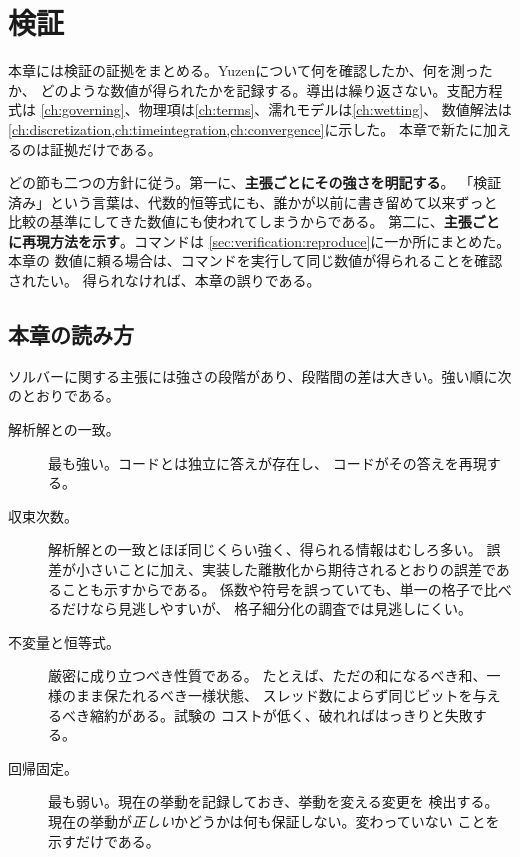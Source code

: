 \chapter{検証}
\label{ch:verification}

本章には検証の証拠をまとめる。Yuzenについて何を確認したか、何を測ったか、
どのような数値が得られたかを記録する。導出は繰り返さない。支配方程式は
\cref{ch:governing}、物理項は\cref{ch:terms}、濡れモデルは\cref{ch:wetting}、
数値解法は\cref{ch:discretization,ch:timeintegration,ch:convergence}に示した。
本章で新たに加えるのは証拠だけである。

どの節も二つの方針に従う。第一に、\textbf{主張ごとにその強さを明記する}。
「検証済み」という言葉は、代数的恒等式にも、誰かが以前に書き留めて以来ずっと
比較の基準にしてきた数値にも使われてしまうからである。
第二に、\textbf{主張ごとに再現方法を示す}。コマンドは
\cref{sec:verification:reproduce}に一か所にまとめた。本章の
数値に頼る場合は、コマンドを実行して同じ数値が得られることを確認されたい。
得られなければ、本章の誤りである。

\section{本章の読み方}
\label{sec:verification:policy}

ソルバーに関する主張には強さの段階があり、段階間の差は大きい。強い順に次のとおりである。

\begin{description}
  \item[解析解との一致。] 最も強い。コードとは独立に答えが存在し、
    コードがその答えを再現する。
  \item[収束次数。] 解析解との一致とほぼ同じくらい強く、得られる情報はむしろ多い。
    誤差が小さいことに加え、実装した離散化から期待されるとおりの誤差であることも示すからである。
    係数や符号を誤っていても、単一の格子で比べるだけなら見逃しやすいが、
    格子細分化の調査では見逃しにくい。
  \item[不変量と恒等式。] 厳密に成り立つべき性質である。
    たとえば、ただの和になるべき和、一様のまま保たれるべき一様状態、
    スレッド数によらず同じビットを与えるべき縮約がある。試験の
    コストが低く、破れればはっきりと失敗する。
  \item[回帰固定。] 最も弱い。現在の挙動を記録しておき、挙動を変える変更を
    検出する。現在の挙動が\emph{正しい}かどうかは何も保証しない。変わっていない
    ことを示すだけである。
\end{description}

